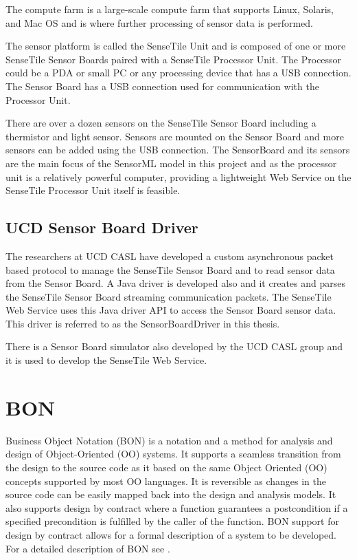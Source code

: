 \documentclass[]{final_report}
\begin{document}
The compute farm is a large-scale compute farm that supports Linux, Solaris, and Mac OS and is where further processing of sensor data is performed.

The sensor platform is called the SenseTile Unit and is composed of one or more SenseTile Sensor Boards paired with a SenseTile Processor Unit. The Processor could be a PDA or small PC or any processing device that has a USB connection.  The Sensor Board has a USB connection used for communication with the Processor Unit. 

There are over a dozen sensors on the SenseTile Sensor Board including a thermistor and light sensor. Sensors are mounted on the Sensor Board and more sensors can be added using the USB connection. The SensorBoard and its sensors are the main focus of the SensorML model in this project and as the processor unit is a relatively powerful computer, providing a lightweight Web Service on the SenseTile Processor Unit itself is feasible.

\subsection{UCD Sensor Board Driver}\label{SensorBoardDriverSec}

The researchers at UCD CASL have developed a custom asynchronous packet based protocol to manage the SenseTile Sensor Board and to read sensor data from the Sensor Board.  A Java driver is developed also and it creates and parses the SenseTile Sensor Board streaming communication packets. The SenseTile Web Service uses this Java driver API to access the Sensor Board sensor data. This driver is referred to as the SensorBoardDriver in this thesis.

There is a Sensor Board simulator also developed by the UCD CASL group and it is used to develop the SenseTile Web Service.


\section{BON} \label{BONsec}
Business Object Notation (BON) is a notation and a method for analysis and design of Object-Oriented (OO) systems. It supports a seamless transition from the design to the source code as it based on the same Object Oriented (OO) concepts supported by most OO languages. It is reversible as changes in the source code can be easily mapped back into the design and analysis models. It also supports design by contract\cite{Meyerref} where a function guarantees a postcondition if a specified precondition is fulfilled by the caller of the function. BON support for design by contract allows for a formal description of a system to be developed. For a detailed description of BON see \cite{BONref}.
\end{document}
